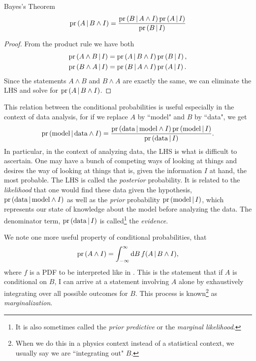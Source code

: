 \begin{theorem}{Bayes's Theorem}{} 
$$
\operatorname{pr}\left(A\,|\, B\land I\right)=\frac{\operatorname{pr}\left(B\,|\, A\land I\right)\operatorname{pr}\left(A\,|\, I\right)}{\operatorname{pr}\left(B\,|\, I\right)}
$$
  \begin{proof}
  From the product rule we have both
\begin{equation*}\begin{aligned}
\operatorname{pr}\left(A\wedge B\,|\, I\right)&=\operatorname{pr}\left(A\,|\, B\wedge I\right)\operatorname{pr}\left(B\,|\, I\right),\\
\operatorname{pr}\left(B\wedge A\,|\, I\right)&=\operatorname{pr}\left(B\,|\, A\wedge I\right)\operatorname{pr}\left(A\,|\, I\right).
\end{aligned}\end{equation*}
  Since the statements $A\land B$ and $B\land A$ are exactly the same, we can
eliminate the LHS and solve for $\operatorname{pr}\left(A\,|\, B\land I\right)$.
  \end{proof}
\end{theorem}

This relation between the conditional probabilities is useful especially in the
context of data analysis, for if we replace $A$ by ``model" and $B$ by ``data",
we get 
\begin{equation}
\operatorname{pr}\left(\text{model}\,|\, \text{data}\land I\right)
=\frac{\operatorname{pr}\left(\text{data}\,|\, \text{model}\land I\right)\operatorname{pr}\left(\text{model}\,|\, I\right)}{\operatorname{pr}\left(\text{data}\,|\,
I\right)}.
\end{equation}
In particular, in the context of analyzing data, the LHS is what is difficult to
ascertain. One may have a bunch of competing ways of looking at things and
desires the way of looking at things that is, given the information $I$ at hand,
the most probable. The LHS is called the {\it posterior}
probability. It is related to the {\it likelihood} that one
would find these data given the hypothesis, $\operatorname{pr}\left(\text{data}\,|\,
\text{model}\land I\right)$ as well as the {\it prior}
probability $\operatorname{pr}\left(\text{model}\,|\, I\right)$, which represents our state of
knowledge about the model before analyzing the data. The denominator term,
$\operatorname{pr}\left(\text{data}\,|\, I\right)$ is called\footnote{It is also sometimes called
the {\it prior predictive} or the 
{\it marginal likelihood}.} 
the {\it evidence}. 

We note one more useful property of conditional probabilities, that
\begin{equation}
\operatorname{pr}\left(A\land I\right)=\int_{-\infty}^\infty \dd{B} f(A\,|\, B\land I),
\end{equation}
where $f$ is a PDF to be interpreted like in .
This is the statement that if $A$ is conditional on $B$, I can arrive at a
statement involving $A$ alone by exhaustively integrating over all possible
outcomes for $B$. This process is known\footnote{When we do this in a physics
context instead of a statistical context, we usually say we are ``integrating
out" $B$.} as {\it marginalization}.

